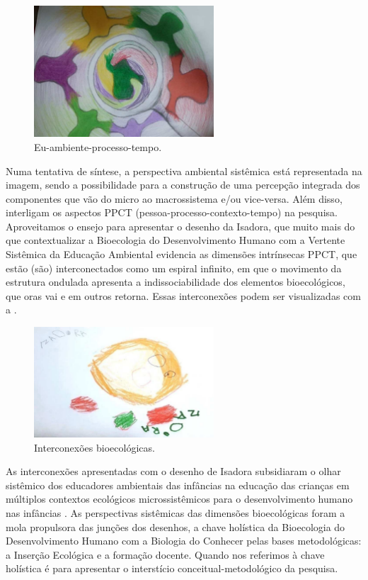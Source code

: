\documentclass{textolivre-html}
\begin{document}
\begin{figure}[h!]
 \centering
 \includegraphics[width=0.6\textwidth]{figure05.pdf}
 \caption{Eu-ambiente-processo-tempo.}
 \label{fig-fig05}
\end{figure}


Numa tentativa de síntese, a perspectiva ambiental sistêmica está representada na imagem, sendo a possibilidade para a construção de uma percepção integrada dos componentes que vão do micro ao macrossistema e/ou vice-versa. Além disso, interligam os aspectos PPCT (pessoa-processo-contexto-tempo) na pesquisa. Aproveitamos o ensejo para apresentar o desenho da Isadora, que muito mais do que contextualizar a Bioecologia do Desenvolvimento Humano com a Vertente Sistêmica da Educação Ambiental evidencia as dimensões intrínsecas PPCT, que estão (são) interconectados como um espiral infinito, em que o movimento da estrutura ondulada apresenta a indissociabilidade dos elementos bioecológicos, que oras vai e em outros retorna. Essas interconexões podem ser visualizadas com a .

\begin{figure}[h!]
 \centering
 \includegraphics[width=0.6\textwidth]{figure06.pdf}
 \caption{Interconexões bioecológicas.}
 \label{fig-fig06}
\end{figure}

As interconexões apresentadas com o desenho de Isadora subsidiaram o olhar sistêmico dos educadores ambientais das infâncias na educação das crianças em múltiplos contextos ecológicos microssistêmicos para o desenvolvimento humano nas infâncias \cite{piske2019}. As perspectivas sistêmicas das dimensões bioecológicas foram a mola propulsora das junções dos desenhos, a chave holística da Bioecologia do Desenvolvimento Humano \cite{brofen2011} com a Biologia do Conhecer \cite{maturana2011} pelas bases metodológicas: a Inserção Ecológica e a formação docente. Quando nos referimos à chave holística é para apresentar o interstício conceitual-metodológico da pesquisa. 
\end{document}
